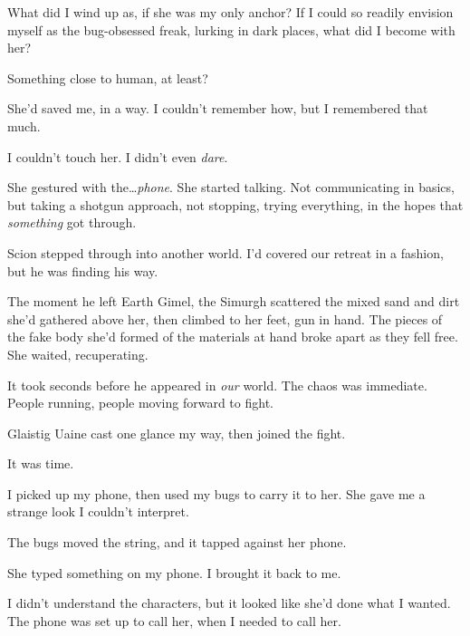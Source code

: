What did I wind up as, if she was my only anchor?  If I could so readily envision myself as the bug-obsessed freak, lurking in dark places, what did I become with her?



Something close to human, at least?



She'd saved me, in a way.  I couldn't remember how, but I remembered that much.



I couldn't touch her.  I didn't even \emph{dare}.



She gestured with the\ldots \emph{phone}.  She started talking.  Not communicating in basics, but taking a shotgun approach, not stopping, trying everything, in the hopes that \emph{something} got through.



Scion stepped through into another world.  I'd covered our retreat in a fashion, but he was finding his way.



The moment he left Earth Gimel, the Simurgh scattered the mixed sand and dirt she'd gathered above her, then climbed to her feet, gun in hand.  The pieces of the fake body she'd formed of the materials at hand broke apart as they fell free.  She waited, recuperating.



It took seconds before he appeared in \emph{our} world.  The chaos was immediate.  People running, people moving forward to fight.



Glaistig Uaine cast one glance my way, then joined the fight.



It was time.



I picked up my phone, then used my bugs to carry it to her.  She gave me a strange look I couldn't interpret.



The bugs moved the string, and it tapped against her phone.



She typed something on my phone.  I brought it back to me.



I didn't understand the characters, but it looked like she'd done what I wanted.  The phone was set up to call her, when I needed to call her.



